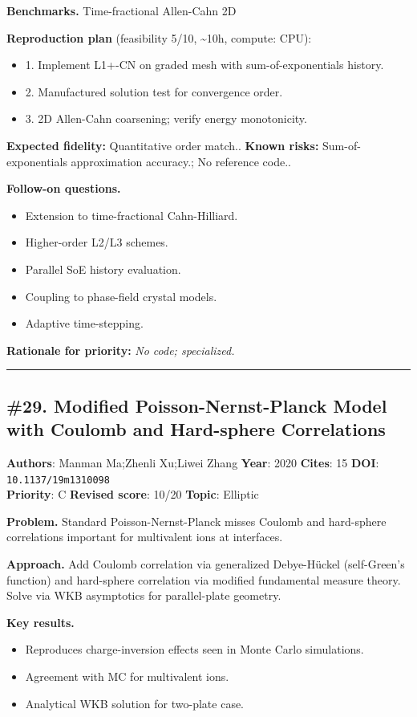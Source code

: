 \documentclass[10pt,letterpaper]{article}
\begin{document}
\textbf{Benchmarks.} Time-fractional Allen-Cahn 2D

\textbf{Reproduction plan} (feasibility 5/10, \textasciitilde10h, compute: CPU):
\begin{itemize}
\item 1. Implement L1+-CN on graded mesh with sum-of-exponentials history.
\item 2. Manufactured solution test for convergence order.
\item 3. 2D Allen-Cahn coarsening; verify energy monotonicity.
\end{itemize}
\textbf{Expected fidelity:} Quantitative order match.. \textbf{Known risks:} Sum-of-exponentials approximation accuracy.; No reference code..

\textbf{Follow-on questions.}
\begin{itemize}
\item Extension to time-fractional Cahn-Hilliard.
\item Higher-order L2/L3 schemes.
\item Parallel SoE history evaluation.
\item Coupling to phase-field crystal models.
\item Adaptive time-stepping.
\end{itemize}

\textbf{Rationale for priority:} \emph{No code; specialized.}

\medskip\hrule\medskip

\subsection*{\#29. Modified Poisson-Nernst-Planck Model with Coulomb and Hard-sphere Correlations}
\textbf{Authors}: Manman Ma;Zhenli Xu;Liwei Zhang \textbullet{} \textbf{Year}: 2020 \textbullet{} \textbf{Cites}: 15 \textbullet{} \textbf{DOI}: \texttt{10.1137/19m1310098} \\
\textbf{Priority}: C \textbullet{} \textbf{Revised score}: 10/20 \textbullet{} \textbf{Topic}: Elliptic

\textbf{Problem.} Standard Poisson-Nernst-Planck misses Coulomb and hard-sphere correlations important for multivalent ions at interfaces.

\textbf{Approach.} Add Coulomb correlation via generalized Debye-Hückel (self-Green's function) and hard-sphere correlation via modified fundamental measure theory. Solve via WKB asymptotics for parallel-plate geometry.

\textbf{Key results.}
\begin{itemize}
\item Reproduces charge-inversion effects seen in Monte Carlo simulations.
\item Agreement with MC for multivalent ions.
\item Analytical WKB solution for two-plate case.
\end{itemize}
\end{document}
